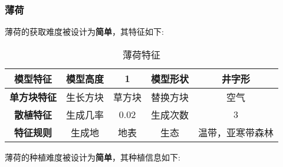 \subsubsection{薄荷}

薄荷的获取难度被设计为\textbf{简单}，其特征如下:
\begin{table}[H]
    \centering
    \caption{薄荷特征}
    \label{table:薄荷特征}
    \setlength{\tabcolsep}{4mm}
    \begin{tabular}{c|cc|cc}
        \toprule
        \textbf{模型特征}   & 模型高度 & 1      & 模型形状 & 井字形     \\
        \midrule
        \textbf{单方块特征} & 生长方块 & 草方块 & 替换方块 & 空气       \\
        \midrule
        \textbf{散植特征}   & 生成几率 & 0.02   & 生成次数 & 3          \\
        \midrule
        \textbf{特征规则}   & 生成地   & 地表   & 生态     & 温带，亚寒带森林 \\
        \bottomrule
    \end{tabular}
\end{table}


薄荷的种植难度被设计为\textbf{简单}，其种植信息如下:

